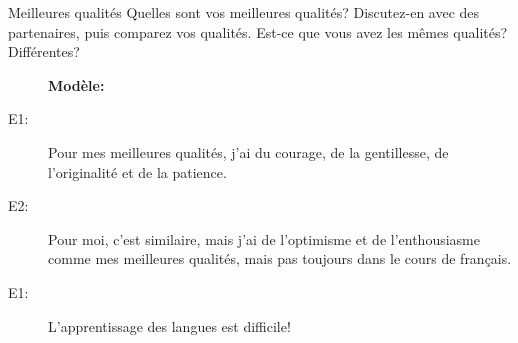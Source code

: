 \begin{frame}{Meilleures qualités}
  Quelles sont vos meilleures qualités?
  Discutez-en avec des partenaires, puis comparez vos qualités.
  Est-ce que vous avez les mêmes qualités? Différentes?
  \begin{description}
    \item[] \textbf{Modèle:}
    \item[E1:] Pour mes meilleures qualités, j'ai du courage, de la gentillesse, de l'originalité et de la patience.
    \item[E2:] Pour moi, c'est similaire, mais j'ai de l'optimisme et de l'enthousiasme comme mes meilleures qualités, mais pas toujours dans le cours de français.
    \item[E1:] L'apprentissage des langues est difficile!
  \end{description}
\end{frame}